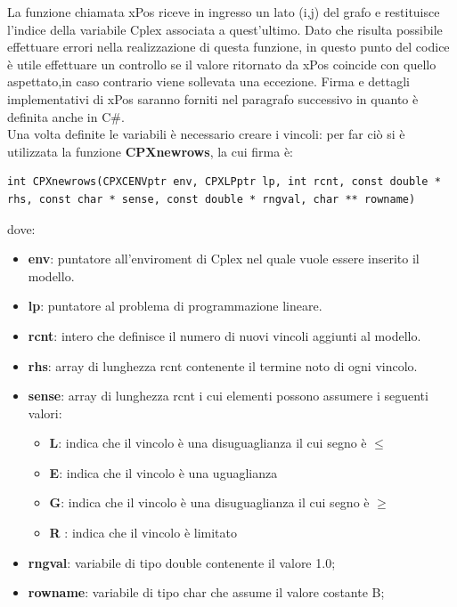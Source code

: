 \documentclass[11pt]{article}
\begin{document}
La funzione chiamata xPos  riceve in ingresso un lato (i,j) del grafo e restituisce l'indice della variabile Cplex associata a quest'ultimo. Dato che risulta possibile effettuare errori nella realizzazione di questa funzione, in questo punto del codice \`e  utile effettuare un controllo se il valore ritornato da xPos coincide con quello aspettato,in caso contrario viene sollevata una eccezione. Firma e dettagli implementativi di xPos saranno forniti nel paragrafo successivo in quanto è definita anche in C\#.\\

Una volta definite le variabili \`e necessario creare i vincoli: per far ci\`o si \`e utilizzata la funzione \textbf{CPXnewrows}, la cui firma \`e:

\begin{lstlisting}
int CPXnewrows(CPXCENVptr env, CPXLPptr lp, int rcnt, const double * rhs, const char * sense, const double * rngval, char ** rowname)
\end{lstlisting}

dove:

\begin{itemize}
\item \textbf{env}: puntatore all'enviroment di Cplex nel quale vuole essere inserito il modello.
\item \textbf{lp}: puntatore al problema di programmazione lineare.
\item \textbf{rcnt}: intero che definisce il numero di nuovi vincoli aggiunti al modello.
\item \textbf{rhs}: array di lunghezza rcnt contenente il termine noto di ogni vincolo.
\item \textbf{sense}: array di lunghezza rcnt i cui elementi possono assumere i seguenti valori:

\begin{itemize}
\item \textbf{L}: indica che il vincolo \`e una disuguaglianza il cui segno \`e  $\leq$
\item \textbf{E}: indica che il vincolo \`e una uguaglianza
\item \textbf{G}: indica che il vincolo \`e una disuguaglianza il cui segno \`e $\geq$
\item \textbf{R} : indica che il vincolo \`e limitato 
\end{itemize}

\item \textbf{rngval}: variabile di tipo double contenente il valore 1.0;
\item \textbf{rowname}: variabile di tipo char che assume il valore costante B;
\end{itemize}
\end{document}
